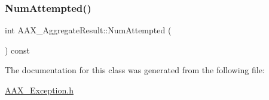 \mbox{\label{a01605_aff31a39e4489a273a28efa37e4aac781}} 
\subsubsection{\texorpdfstring{NumAttempted()}{NumAttempted()}}
{\footnotesize\ttfamily int A\+A\+X\+\_\+\+Aggregate\+Result\+::\+Num\+Attempted (\begin{DoxyParamCaption}{ }\end{DoxyParamCaption}) const\hspace{0.3cm}{\ttfamily [inline]}}



The documentation for this class was generated from the following file\+:\begin{DoxyCompactItemize}
\item 
\mbox{\hyperlink{a00497}{A\+A\+X\+\_\+\+Exception.\+h}}\end{DoxyCompactItemize}
